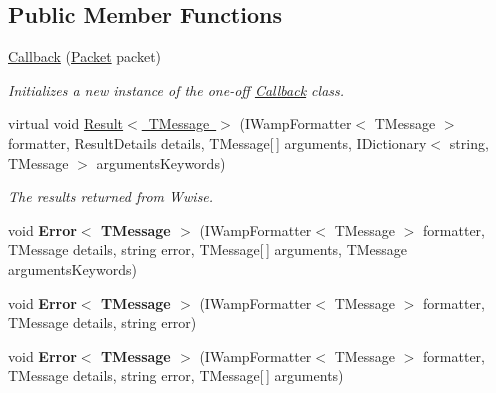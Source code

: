 \subsection*{Public Member Functions}
\begin{DoxyCompactItemize}
\item 
\mbox{\hyperlink{class_waapi_c_s_1_1_communication_1_1_callback_a4b5984e205bd38b0be0d0d843c0681d1}{Callback}} (\mbox{\hyperlink{class_waapi_c_s_1_1_communication_1_1_packet}{Packet}} packet)
\begin{DoxyCompactList}\small\item\em Initializes a new instance of the one-\/off \mbox{\hyperlink{class_waapi_c_s_1_1_communication_1_1_callback}{Callback}} class. \end{DoxyCompactList}\item 
virtual void \mbox{\hyperlink{class_waapi_c_s_1_1_communication_1_1_callback_a5730b33a0a1c0c0b169ad231cf8257ce}{Result$<$ T\+Message $>$}} (I\+Wamp\+Formatter$<$ T\+Message $>$ formatter, Result\+Details details, T\+Message\mbox{[}$\,$\mbox{]} arguments, I\+Dictionary$<$ string, T\+Message $>$ arguments\+Keywords)
\begin{DoxyCompactList}\small\item\em The results returned from Wwise. \end{DoxyCompactList}\item 
\mbox{\label{class_waapi_c_s_1_1_communication_1_1_callback_a1e2f97ef1ee7e5bfa21f30b2362678a8}} 
void {\bfseries Error$<$ T\+Message $>$} (I\+Wamp\+Formatter$<$ T\+Message $>$ formatter, T\+Message details, string error, T\+Message\mbox{[}$\,$\mbox{]} arguments, T\+Message arguments\+Keywords)
\item 
\mbox{\label{class_waapi_c_s_1_1_communication_1_1_callback_aedf34dc2bcc4d45dc742473f3814ec17}} 
void {\bfseries Error$<$ T\+Message $>$} (I\+Wamp\+Formatter$<$ T\+Message $>$ formatter, T\+Message details, string error)
\item 
\mbox{\label{class_waapi_c_s_1_1_communication_1_1_callback_a5649933064eb98a515c982829beb59a1}} 
void {\bfseries Error$<$ T\+Message $>$} (I\+Wamp\+Formatter$<$ T\+Message $>$ formatter, T\+Message details, string error, T\+Message\mbox{[}$\,$\mbox{]} arguments)
\item 

\end{DoxyCompactItemize}
